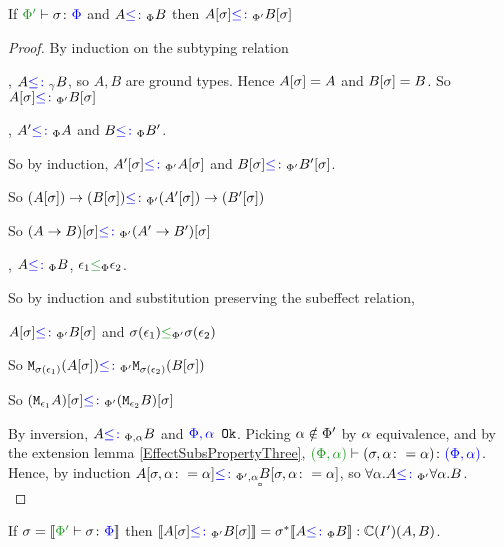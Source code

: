 \documentclass{report}
\begin{document}
\begin{theorem} 
    If $\typerelation{\P'}{\si}{\P}$ and $A{\color{blue} \leq\colon}_\Phi B$ then $A[\sigma]{\color{blue} \leq\colon}_{\Phi'} B[\sigma]$    
\end{theorem}
\begin{framed}
    \begin{proof}
        By induction on the subtyping relation
        
        \case{\sground}
        \bi, $A{\color{blue} \leq\colon}_\gamma B$, so $A, B$ are ground types.
        Hence $A[\sigma] = A$ and $B[\sigma] = B$.
        So $A[\sigma]{\color{blue} \leq\colon}_{\Phi'} B[\sigma]$
        
        \case{\sfun}
        \bi, $A'{\color{blue} \leq\colon}_\Phi A$ and $B{\color{blue} \leq\colon}_\Phi B'$.
        
        So by induction, $A'[\sigma]{\color{blue} \leq\colon}_{\Phi'} A[\sigma]$ and $B[\sigma]{\color{blue} \leq\colon}_{\Phi'} B'[\sigma]$.
        
        So $(A[\sigma])\rightarrow (B[\sigma]){\color{blue} \leq\colon}_{\Phi'} (A'[\sigma])\rightarrow (B'[\sigma])$
        
        So $(A\rightarrow B)[\sigma]{\color{blue} \leq\colon}_{\Phi'} (A'\rightarrow B')[\sigma]$
        
        \case{\seffect}
        
        \bi, $A{\color{blue} \leq\colon}_\Phi B$, $\e_1\subeffectp\e_2$.
        
        So by induction and substitution preserving the subeffect relation, 
        
        $A[\sigma]{\color{blue} \leq\colon}_{\Phi'} B[\sigma]$ and $\si(\e_1)\subeffectpp\si(\e_2)$
        
        So $\texttt{M}_{\sigma(\epsilon_1)}{(A[\sigma])} {\color{blue} \leq\colon}_{\Phi'}\texttt{M}_{\sigma(\epsilon_2)}{(B[\sigma])}$
        
        So $(\texttt{M}_{\epsilon_1}{A})[\sigma] {\color{blue} \leq\colon}_{\Phi'}(\texttt{M}_{\epsilon_2}{B})[\sigma]$
        
        \case{\squant}
        By inversion, $A{\color{blue} \leq\colon}_{\Phi, \alpha} B$ and ${\color{blue} \Phi,\alpha} \texttt{ Ok}$. Picking $\alpha\notin\Phi'$ by $\alpha$ equivalence, and by the extension lemma \ref{EffectSubsPropertyThree}, $\typerelation{(\P,\a)}{(\si, \a\setto\a)}{(\P,\a)}$. Hence, by induction $A[\sigma, \alpha\colon=\alpha]{\color{blue} \leq\colon}_{\Phi', \alpha} B[\sigma, \alpha\colon=\alpha]$, so $\forall \alpha. A{\color{blue} \leq\colon}_{\Phi'}\forall \alpha. B$.
        $$\square$$
    \end{proof}
    
\end{framed}

\begin{theorem}
    If $\si = \deno{\typerelation{\P'}{\si}{\P}}$ then ${\bf [\![}A[\sigma]{\color{blue} \leq\colon}_{\Phi'} B[\sigma]{\bf ]\!]} = \sigma^*{\bf [\![}A{\color{blue} \leq\colon}_\Phi B{\bf ]\!]}: \mathbb{C}(I')(A, B)$.    
\end{theorem}
\end{document}
